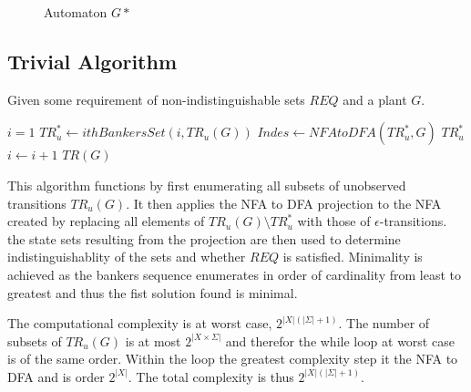 \documentclass{article}
\begin{document}
			\begin{figure}[ht]
			\begin{minipage}[b]{\linewidth}
			\centering
			    \caption{Automaton $G\ast$}
			    \label{CounterExampleAutomatonGStar}
			\end{minipage}
			\end{figure}


		\subsection{Trivial Algorithm}
			Given some requirement of non-indistinguishable sets $REQ$ and a plant $G$.

			\begin{algorithmic}[5]
				\STATE $i=1$
					\STATE $TR_u^* \leftarrow ithBankersSet(i,TR_u(G))$
					\STATE $Indes \leftarrow NFAtoDFA(TR_u^*,G)$
						\RETURN $TR_u^*$
					\ENDIF
					\STATE $i \leftarrow i + 1$
				\ENDWHILE
				\RETURN $TR(G)$
			\end{algorithmic}

			This algorithm functions by first enumerating all subsets of unobserved transitions $TR_u(G)$. It then applies the NFA to DFA projection to the NFA created by replacing all elements of $TR_u(G) \setminus TR_u^*$ with those of $\epsilon$-transitions. the state sets resulting from the projection are then used to determine indistinguishablity of the sets and whether $REQ$ is satisfied. Minimality is achieved as the bankers sequence enumerates in order of cardinality from least to greatest and thus the fist solution found is minimal. 

			The computational complexity is at worst case, $2^{|X|(|\Sigma|+1)}$. The number of subsets of $TR_u(G)$ is at most $2^{|X\times\Sigma|}$ and therefor the while loop at worst case is of the same order. Within the loop the greatest complexity step it the NFA to DFA and is order $2^{|X|}$. The total complexity is thus $2^{|X|(|\Sigma|+1)}$.
\end{document}

